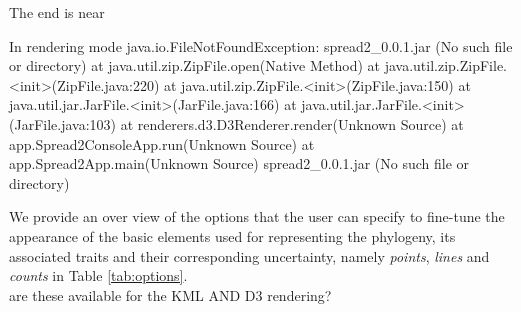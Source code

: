 \documentclass[english]{paper}
\begin{document}
                      The end is near

In rendering mode
java.io.FileNotFoundException: spread2_0.0.1.jar (No such file or directory)
	at java.util.zip.ZipFile.open(Native Method)
	at java.util.zip.ZipFile.<init>(ZipFile.java:220)
	at java.util.zip.ZipFile.<init>(ZipFile.java:150)
	at java.util.jar.JarFile.<init>(JarFile.java:166)
	at java.util.jar.JarFile.<init>(JarFile.java:103)
	at renderers.d3.D3Renderer.render(Unknown Source)
	at app.Spread2ConsoleApp.run(Unknown Source)
	at app.Spread2App.main(Unknown Source)
spread2_0.0.1.jar (No such file or directory)

 
\par
We provide an over view of the options that the user can specify to fine-tune the appearance of the basic elements used for representing the phylogeny, its associated traits and their corresponding uncertainty, namely \textit{points}, \textit{lines} and \textit{counts} in Table \ref{tab:options}.
\\are these available for the KML AND D3 rendering?
\end{document}
